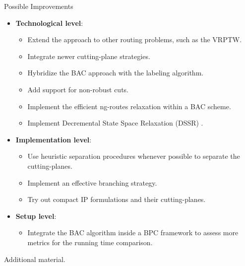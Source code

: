 \begin{frame}{Possible Improvements}
	\begin{itemize}
		\item \textbf{Technological level}:
		      \begin{itemize}
			      \item Extend the approach to  other routing problems, such as the VRPTW.
			      \item Integrate newer cutting-plane strategies.
			      \item Hybridize the BAC approach with the labeling algorithm.
			      \item Add support for non-robust cuts.
			      \item Implement the efficient ng-routes relaxation \parencite{baldacci2011} within a BAC scheme.
			      \item Implement Decremental State Space Relaxation (DSSR) \parencite{boland2006, righini2008}.
		      \end{itemize}
		\item \textbf{Implementation level}:
		      \begin{itemize}
			      \item Use heuristic separation procedures whenever possible to separate the cutting-planes.
			      \item Implement an effective branching strategy.
			      \item Try out compact IP formulations and their cutting-planes.
		      \end{itemize}
		\item \textbf{Setup level}:
		      \begin{itemize}
			      \item Integrate the BAC algorithm inside a BPC framework to assess more metrics for the running time comparison.
		      \end{itemize}
	\end{itemize}
\end{frame}

\appendix

\begin{frame}
\end{frame}

\begin{frame}
	\begin{center}
		\begingroup
		\fontsize{18pt}{18pt}\selectfont
		Additional material.
		\endgroup
	\end{center}
\end{frame}

